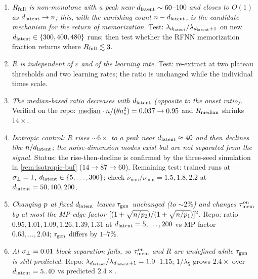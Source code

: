\begin{enumerate}
\item \emph{$R_{\rm full}$ is non-monotone with a peak near $d_{\mathrm{latent}}\sim60$--$100$ and closes to $O(1)$ as $d_{\mathrm{latent}}\to n$; this, with the vanishing count $n-d_{\mathrm{latent}}$, is the candidate mechanism for the return of memorization.} Test: $\lambda_{d_{\mathrm{latent}}}/\lambda_{d_{\mathrm{latent}}+1}$ on new $d_{\mathrm{latent}}\in\{300,400,480\}$ runs; then test whether the RFNN memorization fraction returns where $R_{\rm full}\lesssim3$.
\item \emph{$R$ is independent of $\varepsilon$ and of the learning rate.} Test: re-extract at two plateau thresholds and two learning rates; the ratio is unchanged while the individual times scale.
\item \emph{The median-based ratio decreases with $d_{\mathrm{latent}}$ (opposite to the onset ratio).} Verified on the repo: $\mathrm{median}\cdot n/(\theta a_*^2)=0.037\to0.95$ and $R_{\rm median}$ shrinks $14\times$.
\item \emph{Isotropic control: $R$ rises $\sim6\times$ to a peak near $d_{\mathrm{latent}}\approx40$ and then declines like $n/d_{\mathrm{latent}}$; the noise-dimension modes exist but are not separated from the signal.} Status: the rise-then-decline is confirmed by the three-seed simulation in \cref{rem:isotropic-buf} ($14\to87\to60$). Remaining test: trained runs at $\sigma_{\perp}=1$, $d_{\mathrm{latent}}\in\{5,\dots,300\}$; check $\tilde\nu_{\min}/\nu_{\min}=1.5,1.8,2.2$ at $d_{\mathrm{latent}}=50,100,200$.
\item \emph{Changing $p$ at fixed $d_{\mathrm{latent}}$ leaves $\tau_{\mathrm{gen}}$ unchanged (to $\sim2\%$) and changes $\tau_{\mathrm{mem}}^{\rm on}$ by at most the MP-edge factor $[(1+\sqrt{n/p_2})/(1+\sqrt{n/p_1})]^2$.} Repo: ratio $0.95,1.01,1.09,1.26,1.39,1.31$ at $d_{\mathrm{latent}}=5,\dots,200$ vs MP factor $0.63,\dots,2.04$; $\tau_{\mathrm{gen}}$ differs by $1$--$7\%$.
\item \emph{At $\sigma_{\perp}=0.01$ block separation fails, so $\tau_{\mathrm{mem}}^{\rm on}$ and $R$ are undefined while $\tau_{\mathrm{gen}}$ is still predicted.} Repo: $\lambda_{d_{\mathrm{latent}}}/\lambda_{d_{\mathrm{latent}}+1}=1.0$--$1.15$; $1/\lambda_5$ grows $2.4\times$ over $d_{\mathrm{latent}}=5..40$ vs predicted $2.4\times$.
\end{enumerate}

